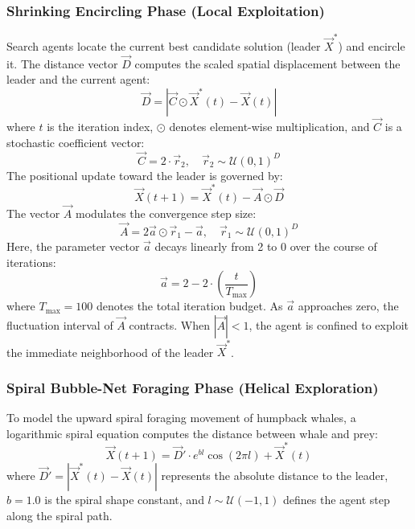 \documentclass[conference]{IEEEtran}
\begin{document}
\subsubsection{Shrinking Encircling Phase (Local Exploitation)}
Search agents locate the current best candidate solution (leader $\vec{X}^*$) and encircle it. The distance vector $\vec{D}$ computes the scaled spatial displacement between the leader and the current agent:
\begin{equation}
\vec{D} = \left| \vec{C} \odot \vec{X}^*(t) - \vec{X}(t) \right|
\end{equation}
where $t$ is the iteration index, $\odot$ denotes element-wise multiplication, and $\vec{C}$ is a stochastic coefficient vector:
\begin{equation}
\vec{C} = 2 \cdot \vec{r}_2, \quad \vec{r}_2 \sim \mathcal{U}(0, 1)^D
\end{equation}
The positional update toward the leader is governed by:
\begin{equation}
\vec{X}(t+1) = \vec{X}^*(t) - \vec{A} \odot \vec{D}
\end{equation}
The vector $\vec{A}$ modulates the convergence step size:
\begin{equation}
\vec{A} = 2\vec{a} \odot \vec{r}_1 - \vec{a}, \quad \vec{r}_1 \sim \mathcal{U}(0, 1)^D
\end{equation}
Here, the parameter vector $\vec{a}$ decays linearly from 2 to 0 over the course of iterations:
\begin{equation}
\vec{a} = 2 - 2 \cdot \left(\frac{t}{T_{\text{max}}}\right)
\end{equation}
where $T_{\text{max}} = 100$ denotes the total iteration budget. As $\vec{a}$ approaches zero, the fluctuation interval of $\vec{A}$ contracts. When $|\vec{A}| < 1$, the agent is confined to exploit the immediate neighborhood of the leader $\vec{X}^*$.

\subsubsection{Spiral Bubble-Net Foraging Phase (Helical Exploration)}
To model the upward spiral foraging movement of humpback whales, a logarithmic spiral equation computes the distance between whale and prey:
\begin{equation}
\vec{X}(t+1) = \vec{D}' \cdot e^{bl} \cos(2\pi l) + \vec{X}^*(t)
\end{equation}
where $\vec{D}' = \left| \vec{X}^*(t) - \vec{X}(t) \right|$ represents the absolute distance to the leader, $b = 1.0$ is the spiral shape constant, and $l \sim \mathcal{U}(-1, 1)$ defines the agent step along the spiral path.
\end{document}
